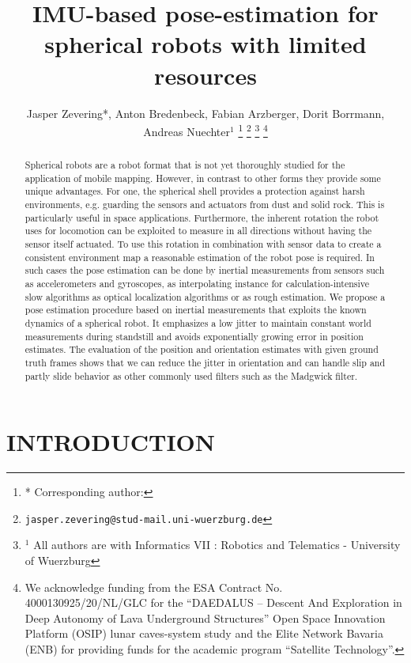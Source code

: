 \documentclass[letterpaper, 10 pt, conference]{ieeeconf}  %
\title{\LARGE \bf
IMU-based pose-estimation for spherical robots with limited resources
}
\author{Jasper Zevering*, Anton Bredenbeck, Fabian Arzberger, Dorit Borrmann, Andreas Nuechter$^{1}$%
\thanks{*
        Corresponding author: }%
        \thanks{ \quad  \tt\small jasper.zevering@stud-mail.uni-wuerzburg.de}%
\thanks{$^{1}$ All authors are with Informatics VII : Robotics and Telematics - University of Wuerzburg}%
\thanks{We acknowledge funding from the ESA Contract No. 4000130925/20/NL/GLC for the “DAEDALUS – Descent And Exploration in Deep Autonomy of Lava Underground Structures” Open Space Innovation Platform (OSIP) lunar caves-system study and the Elite Network Bavaria (ENB) for providing funds for the academic program “Satellite Technology”.}
}
\begin{document}
\maketitle
\thispagestyle{empty}
\pagestyle{empty}


\begin{abstract}

Spherical robots are a robot format that is not yet thoroughly studied for the application of mobile mapping.
However, in contrast to other forms they provide some unique advantages.
For one, the spherical shell provides a protection against harsh environments, e.g. guarding the sensors and actuators from dust and solid rock.
This is particularly useful in space applications. 
Furthermore, the inherent rotation the robot uses for locomotion can be exploited to measure in all directions without having the sensor itself actuated.
To use this rotation in combination with sensor data to create a consistent environment map a reasonable estimation of the robot pose is required. 
In such cases the pose estimation can be done by inertial measurements from sensors such as accelerometers and gyroscopes, as interpolating instance for calculation-intensive slow algorithms as optical localization algorithms or as rough estimation.
We propose a pose estimation procedure based on inertial measurements that exploits the known dynamics of a spherical robot. 
It emphasizes a low jitter to maintain constant world measurements during standstill and avoids exponentially growing error in position estimates. 
The evaluation of  the position and orientation estimates with given ground truth frames shows that we can reduce the jitter in orientation and can handle slip and partly slide behavior as other commonly used filters such as the Madgwick filter. 

\end{abstract}


\section{INTRODUCTION}
\end{document}
